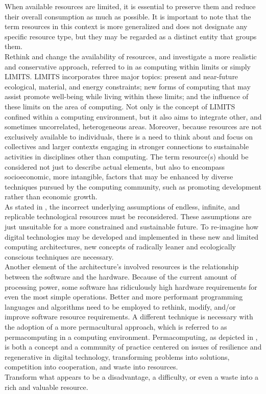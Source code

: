 When available resources are limited, it is essential to preserve them and reduce
their overall consumption as much as possible. It is important to note that the
term resources in this context is more generalized and does not designate any
specific resource type, but they may be regarded as a distinct entity that groups
them. \\ %
Rethink and change the availability of resources, and investigate a more
realistic and conservative approach, referred to in \cite{computing_within_limits}
as computing within limits or simply LIMITS. LIMITS incorporates three major
topics: present and near-future ecological, material, and energy constraints;
new forms of computing that may assist promote well-being while living within
these limits; and the influence of these limits on the area of computing. Not
only is the concept of LIMITS confined within a computing environment, but it also
aims to integrate other, and sometimes uncorrelated, heterogeneous areas.
Moreover, because resources are not exclusively available to individuals, there
is a need to think about and focus on collectives and larger contexts engaging
in stronger connections to sustainable activities in disciplines other than
computing. The term resource(s) should be considered not just to describe actual
elements, but also to encompass socioeconomic, more intangible, factors that may
be enhanced by diverse techniques pursued by the computing community, such as
promoting development rather than economic growth. \\ %
As stated in \cite{ed_tech}, the incorrect underlying assumptions of endless,
infinite, and replicable technological resources must be reconsidered. These
assumptions are just unsuitable for a more constrained and sustainable future. To
re-imagine how digital technologies may be developed and implemented in these new
and limited computing architectures, new concepts of radically leaner and
ecologically conscious techniques are necessary. \\ %
Another element of the architecture's involved resources is the relationship
between the software and the hardware. Because of the current amount of processing
power, some software has ridiculously high hardware requirements for even the
most simple operations. Better and more performant programming languages and algorithms
need to be employed to rethink, modify, and/or improve software resource requirements.
A different technique is necessary with the adoption of a more permacultural
approach, which is referred to as permacomputing in a computing environment.
Permacomputing, as depicted in \cite{permacomputing}, is both a concept and a
community of practice centered on issues of resilience and regenerative in
digital technology, transforming problems into solutions, competition into
cooperation, and waste into resources. \\ %
Transform what appears to be a disadvantage, a difficulty, or even a waste into a
rich and valuable resource. \\ %

